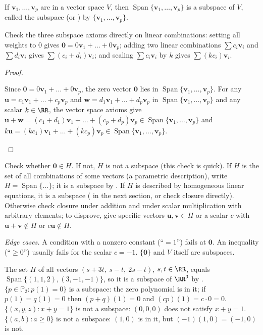 \documentclass[10pt]{scrartcl}
\newcommand{\vv}[1]{\mathbf{#1}}
\DeclareMathOperator{\spn}{Span}\DeclareMathOperator{\Nul}{Nul}\DeclareMathOperator{\Col}{Col}\DeclareMathOperator{\Row}{Row}\DeclareMathOperator{\adj}{adj}
\begin{document}
\begin{theorem*}
  If $\vv v_1,\dots,\vv v_p$ are in a vector space $V$, then $\spn\{\vv v_1,\dots,\vv v_p\}$ is a subspace of $V$, called the subspace  (or ) by $\{\vv v_1,\dots,\vv v_p\}$.
\end{theorem*}
\begin{ideabox}
  Check the three subspace axioms directly on linear combinations: setting all weights to $0$ gives $\vv 0=0\vv v_1+\dots+0\vv v_p$; adding two linear combinations $\sum c_i\vv v_i$ and $\sum d_i\vv v_i$ gives $\sum(c_i+d_i)\vv v_i$; and scaling $\sum c_i\vv v_i$ by $k$ gives $\sum(kc_i)\vv v_i$.
\end{ideabox}
\begin{proof}
  \begin{steps}
    \ii Since $\vv 0=0\vv v_1+\dots+0\vv v_p$, the zero vector $\vv 0$ lies in $\spn\{\vv v_1,\dots,\vv v_p\}$.
    \ii For any $\vv u=c_1\vv v_1+\dots+c_p\vv v_p$ and $\vv w=d_1\vv v_1+\dots+d_p\vv v_p$ in $\spn\{\vv v_1,\dots,\vv v_p\}$ and any scalar $k\in\RR$, the vector space axioms give $\vv u+\vv w=(c_1+d_1)\vv v_1+\dots+(c_p+d_p)\vv v_p\in\spn\{\vv v_1,\dots,\vv v_p\}$ and $k\vv u=(kc_1)\vv v_1+\dots+(kc_p)\vv v_p\in\spn\{\vv v_1,\dots,\vv v_p\}$.
  \end{steps}
\end{proof}

\begin{steps}
  \ii Check whether $\vv 0\in H$. If not, $H$ is not a subspace (this check is quick).
  \ii If $H$ is the set of all combinations of some vectors (a parametric description), write $H=\spn\{\dots\}$; it is a subspace by .
  \ii If $H$ is described by homogeneous linear equations, it is a subspace ( in the next section, or check closure directly).
  \ii Otherwise check closure under addition and under scalar multiplication with arbitrary elements; to disprove, give specific vectors $\vv u,\vv v\in H$ or a scalar $c$ with $\vv u+\vv v\notin H$ or $c\vv u\notin H$.
\end{steps}
\emph{Edge cases.} A condition with a nonzero constant (``$=1$'') fails at $\vv 0$. An inequality (``$\ge0$'') usually fails for the scalar $c=-1$. $\{\vv 0\}$ and $V$ itself are subspaces.

\begin{example*}
\begin{itemize}
  \ii The set $H$ of all vectors $(s+3t,\ s-t,\ 2s-t)$, $s,t\in\RR$, equals $\spn\{(1,1,2),(3,-1,-1)\}$, so it is a subspace of $\RR^3$ by .
  \ii $\{p\in\mathbb P_2: p(1)=0\}$ is a subspace: the zero polynomial is in it; if $p(1)=q(1)=0$ then $(p+q)(1)=0$ and $(cp)(1)=c\cdot0=0$.
  \ii $\{(x,y,z): x+y=1\}$ is not a subspace: $(0,0,0)$ does not satisfy $x+y=1$.
  \ii $\{(a,b): a\ge0\}$ is not a subspace: $(1,0)$ is in it, but $(-1)(1,0)=(-1,0)$ is not.
\end{itemize}
\end{example*}
\end{document}
